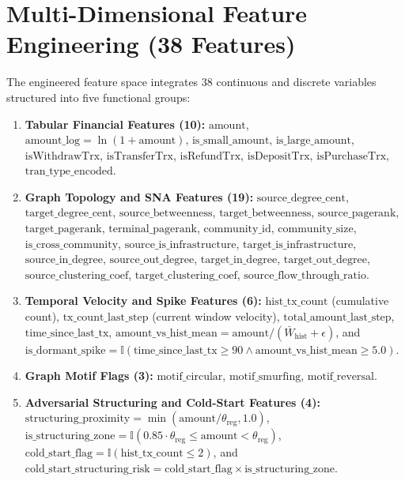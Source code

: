 \section{Multi-Dimensional Feature Engineering (38 Features)}
The engineered feature space integrates 38 continuous and discrete variables structured into five functional groups:
\begin{enumerate}
    \item \textbf{Tabular Financial Features (10):} $\text{amount}$, $\text{amount\_log} = \ln(1 + \text{amount})$, $\text{is\_small\_amount}$, $\text{is\_large\_amount}$, $\text{isWithdrawTrx}$, $\text{isTransferTrx}$, $\text{isRefundTrx}$, $\text{isDepositTrx}$, $\text{isPurchaseTrx}$, $\text{tran\_type\_encoded}$.
    \item \textbf{Graph Topology and SNA Features (19):} $\text{source\_degree\_cent}$, $\text{target\_degree\_cent}$, $\text{source\_betweenness}$, $\text{target\_betweenness}$, $\text{source\_pagerank}$, $\text{target\_pagerank}$, $\text{terminal\_pagerank}$, $\text{community\_id}$, $\text{community\_size}$, $\text{is\_cross\_community}$, $\text{source\_is\_infrastructure}$, $\text{target\_is\_infrastructure}$, $\text{source\_in\_degree}$, $\text{source\_out\_degree}$, $\text{target\_in\_degree}$, $\text{target\_out\_degree}$, $\text{source\_clustering\_coef}$, $\text{target\_clustering\_coef}$, $\text{source\_flow\_through\_ratio}$.
    \item \textbf{Temporal Velocity and Spike Features (6):} $\text{hist\_tx\_count}$ (cumulative count), $\text{tx\_count\_last\_step}$ (current window velocity), $\text{total\_amount\_last\_step}$, $\text{time\_since\_last\_tx}$, $\text{amount\_vs\_hist\_mean} = \text{amount} / (\bar{W}_{\text{hist}} + \epsilon)$, and $\text{is\_dormant\_spike} = \mathbb{I}(\text{time\_since\_last\_tx} \ge 90 \land \text{amount\_vs\_hist\_mean} \ge 5.0)$.
    \item \textbf{Graph Motif Flags (3):} $\text{motif\_circular}$, $\text{motif\_smurfing}$, $\text{motif\_reversal}$.
    \item \textbf{Adversarial Structuring and Cold-Start Features (4):} $\text{structuring\_proximity} = \min(\text{amount} / \theta_{\text{reg}}, 1.0)$, $\text{is\_structuring\_zone} = \mathbb{I}(0.85 \cdot \theta_{\text{reg}} \le \text{amount} < \theta_{\text{reg}})$, $\text{cold\_start\_flag} = \mathbb{I}(\text{hist\_tx\_count} \le 2)$, and $\text{cold\_start\_structuring\_risk} = \text{cold\_start\_flag} \times \text{is\_structuring\_zone}$.
\end{enumerate}

